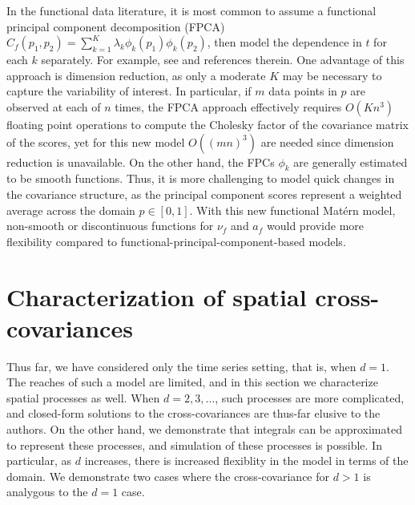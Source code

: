 \documentclass[11pt]{article}
\begin{document}
In the functional data literature, it is most common to assume a functional principal component decomposition (FPCA) $C_f(p_1, p_2) = \sum_{k=1}^K \lambda_k \phi_k(p_1) \phi_k(p_2)$, then model the dependence in $t$ for each $k$ separately. For example, see \cite{martinez-hernadez_recent_2020} and references therein. One advantage of this approach is dimension reduction, as only a moderate $K$ may be necessary to capture the variability of interest. In particular, if $m$ data points in $p$ are observed at each of $n$ times, the FPCA approach effectively requires $O(Kn^3)$ floating point operations to compute the Cholesky factor of the covariance matrix of the scores, yet for this new model $O((mn)^3)$ are needed since dimension reduction is unavailable. On the other hand, the FPCs $\phi_k$ are generally estimated to be smooth functions. Thus, it is more challenging to model quick changes in the covariance structure, as the principal component scores represent a weighted average across the domain $p \in [0,1]$. With this new functional Mat\'ern model, non-smooth or discontinuous functions for $\nu_f$ and $a_f$ would provide more flexibility compared to functional-principal-component-based models. 

\section{Characterization of spatial cross-covariances}\label{sec:spatial}

Thus far, we have considered only the time series setting, that is, when $d=1$. The reaches of such a model are limited, and in this section we characterize spatial processes as well. When $d=2, 3, \dots$, such processes are more complicated, and closed-form solutions to the cross-covariances are thus-far elusive to the authors. On the other hand, we demonstrate that integrals can be approximated to represent these processes, and simulation of these processes is possible. In particular, as $d$ increases, there is increased flexiblity in the model in terms of the domain. We demonstrate two cases where the cross-covariance for $d > 1$ is analygous to the $d=1$ case. %
\end{document}
